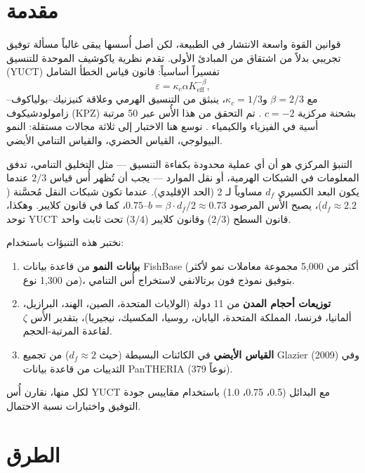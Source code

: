 \documentclass[11pt,a4paper]{article}
\newcommand{\eps}{\varepsilon}
\newcommand{\kappac}{\kappa_c}
\newcommand{\Keff}{K_{\mathrm{eff}}}
\newcommand{\betaf}{\beta}
\newcommand{\df}{d_f}
\begin{document}
	\vspace{0.4cm}
	
	\section{مقدمة}
	
	قوانين القوة واسعة الانتشار في الطبيعة، لكن أصل أُسسها يبقى غالباً مسألة توفيق تجريبي بدلاً من اشتقاق من المبادئ الأولى. تقدم نظرية ياكوشيف الموحدة للتنسيق (YUCT) تفسيراً أساسياً: قانون قياس الخطأ الشامل
	\[
	\eps = \kappac \alpha \Keff^{-\betaf},
	\]
	مع \(\betaf = 2/3\) و\(\kappac = 1/3\)، ينبثق من التنسيق الهرمي وعلاقة كنيزنيك–بولياكوف–زامولودشيكوف (KPZ) بشحنة مركزية \(c = -2\) \cite{AppendixY, AppendixL}. تم التحقق من هذا الأُس عبر 50 مرتبة أسية في الفيزياء والكيمياء \cite{AppendixC, AppendixG}. نوسع هنا الاختبار إلى ثلاثة مجالات مستقلة: النمو البيولوجي، القياس الحضري، والقياس التنامي الأيضي.
	
	التنبؤ المركزي هو أن أي عملية محدودة بكفاءة التنسيق — مثل التخليق التنامي، تدفق المعلومات في الشبكات الهرمية، أو نقل الموارد — يجب أن تُظهر أُس قياس \(2/3\) عندما يكون البعد الكسيري \(\df\) مساوياً لـ 2 (الحد الإقليدي). عندما تكون شبكات النقل مُحسَّنة (\(\df \approx 2.2\))، يصبح الأُس المرصود \(b = \betaf \cdot \df/2 \approx 0.73\)–\(0.75\)، كما في قانون كلايبر. وهكذا، توحد YUCT قانون السطح (\(2/3\)) وقانون كلايبر (\(3/4\)) تحت ثابت واحد.
	
	نختبر هذه التنبؤات باستخدام:
	\begin{enumerate}
		\item \textbf{بيانات النمو} من قاعدة بيانات FishBase (أكثر من 5,000 مجموعة معاملات نمو لأكثر من 1,300 نوع)، بتوفيق نموذج فون برتالانفي لاستخراج أُس التنامي.
		\item \textbf{توزيعات أحجام المدن} من 11 دولة (الولايات المتحدة، الصين، الهند، البرازيل، ألمانيا، فرنسا، المملكة المتحدة، اليابان، روسيا، المكسيك، نيجيريا)، بتقدير الأُس \(\zeta\) لقاعدة المرتبة-الحجم.
		\item \textbf{القياس الأيضي} في الكائنات البسيطة (حيث \(\df \approx 2\)) من تجميع Glazier (2009) وفي الثدييات من قاعدة بيانات PanTHERIA (379 نوعاً).
	\end{enumerate}
	لكل منها، نقارن أُس YUCT مع البدائل (0.5، 0.75، 1.0) باستخدام مقاييس جودة التوفيق واختبارات نسبة الاحتمال.
	
	\section{الطرق}
	
\end{document}
